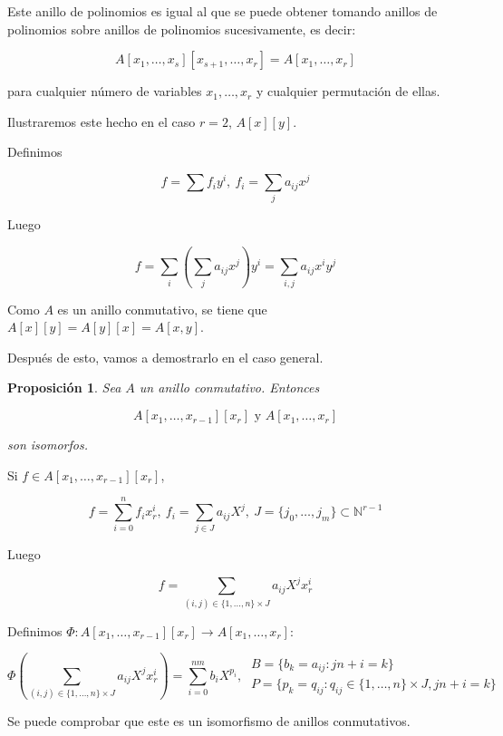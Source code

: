 \documentclass[11pt, a4paper, titlepage]{article}
\makeatletter
\newif\IfInSansMode
\let\oldsf\sffamily
\renewcommand*{\sffamily}{\oldsf\mathversion{sans}\InSansModetrue}
\let\oldnorm\normalfont
\renewcommand*{\normalfont}{\oldnorm\InSansModefalse\mathversion{normal}}
\renewenvironment{proof}[1][\proofname] {\vspace{-15pt}\par\pushQED{\qed}\normalfont\topsep6\p@\@plus6\p@\relax\trivlist\item[\hskip\labelsep\it#1\@addpunct{.}]\ignorespaces}{\popQED\endtrivlist\@endpefalse}
\renewenvironment{proof}[1][\proofname] {\par\pushQED{\qed}\normalfont\topsep6\p@\@plus6\p@\relax\trivlist\item[\hskip\labelsep\itshape\sffamily#1\@addpunct{.}]\ignorespaces}{\popQED\endtrivlist\@endpefalse}
\theoremstyle{theorem-style}
\newtheorem{nprop}{Proposición}[section]
\theoremstyle{definition-style}
\theoremstyle{remark-style}
\theoremstyle{example-style}
\makeatother
\begin{document}
Este anillo de polinomios es igual al que se puede obtener tomando anillos de polinomios sobre anillos de polinomios sucesivamente,
es decir:

\[
    A[x_1, \dots, x_{s}][x_{s+1}, \dots, x_{r}] = A[x_1, \dots, x_r]
\]

para cualquier número de variables $x_1, \dots, x_r$ y cualquier permutación de ellas.

Ilustraremos este hecho en el caso $r=2$, $A[x][y]$.

Definimos

\[
f=\sum f_i y^i,\ f_i = \sum_j a_{ij}x^j
\]

Luego

\[
f = \sum_i \left(\sum_j a_{ij}x^j \right)y^i = \sum_{i,j} a_{ij}x^iy^j
\]

Como $A$ es un anillo conmutativo, se tiene que $A[x][y] = A[y][x] = A[x,y]$.

Después de esto, vamos a demostrarlo en el caso general.

\begin{nprop}
  Sea $A$ un anillo conmutativo. Entonces

  \[
     A[x_1, \dots, x_{r-1}][x_r] \text{ y } A[x_1, \dots, x_r]
  \]

   son isomorfos.
\end{nprop}

\begin{proof}
  Si $f \in A[x_1, \dots, x_{r-1}][x_r]$,

  \[
       f = \sum_{i=0}^n f_i x_r^i,\ f_i = \sum_{j\in J} a_{ij} X^j,\ J = \{j_0, \dots, j_m\} \subset \mathbb{N}^{r-1}
  \]

  Luego

  \[
      f = \sum_{(i,j) \in \{1,\dots,n\}\times J} a_{ij}X^j x_r^i
  \]

  Definimos $\Phi : A[x_1, \dots, x_{r-1}][x_r] \to A[x_1, \dots, x_r]$:

  \[
    \Phi \left(\sum_{(i,j) \in \{1,\dots,n\}\times J} a_{ij}X^j x_r^i\right) = \sum_{i=0}^{nm} b_i X^{p_i},\
    \begin{array}{l}
      B = \{ b_k = a_{ij} : jn + i = k \} \\
      P = \{ p_k = q_{ij} : q_{ij} \in \{1, \dots, n \} \times J, jn+i = k \}
    \end{array}
  \]

  Se puede comprobar que este es un isomorfismo de anillos conmutativos.

\end{proof}
\end{document}
